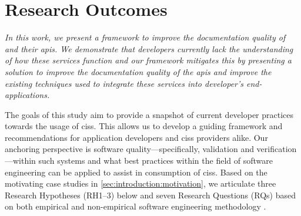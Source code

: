 \section{Research Outcomes}
\label{sec:introduction:hypohtesis}

\bigskip
\itshape
In this work, we present a framework to improve the documentation quality of  and their \glspl{api}. We demonstrate that developers currently lack the understanding of how these services function and our framework mitigates this by presenting a solution to improve the documentation quality of the \glspl{api} and improve the existing techniques used to integrate these services into developer's end-applications.

\upshape
\bigskip

The goals of this study aim to provide a snapshot of current developer practices towards the usage of \glspl{cis}. This allows us to develop a guiding framework and recommendations for application developers and \glspl{cis} providers alike. Our anchoring perspective is software quality---specifically, validation and verification---within such systems and what best practices within the field of software engineering can be applied to assist in consumption of \glspl{cis}.
 Based on the motivating case studies in \cref{sec:introduction:motivation}, we articulate three Research Hypotheses (RH1--3) below and seven Research Questions (RQs) based on  both empirical and non-empirical software engineering methodology \citep{Shull:2007vh,Simon:1996uw}.

\newcommand{\rh}[1]{\hyperref[rh#1]{RH#1}}

